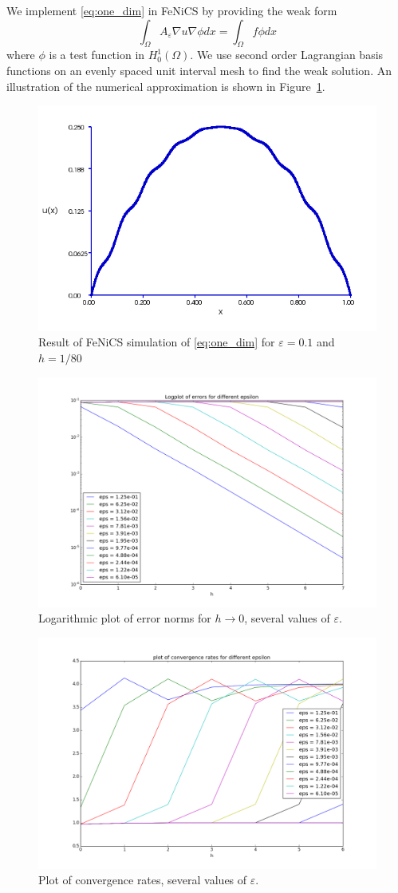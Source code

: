 \documentclass{article}
\renewcommand{\epsilon}{\varepsilon}
\begin{document}
We implement \eqref{eq:one_dim} in FeNiCS by providing the weak form
\begin{equation}
    \int_\Omega A_\epsilon\nabla u\nabla\phi dx= \int_\Omega f\phi dx
\end{equation}
where $\phi$ is a test function in $H^1_0(\Omega)$. We use second order Lagrangian basis functions on an evenly spaced unit interval mesh to find the weak solution.
An illustration of the numerical approximation is shown in Figure~\ref{fig:one_dim_approx}. 

\begin{figure}[ht]
    \centering
    \includegraphics[width=0.5\linewidth]{one_dim_approx.png}
    \caption{Result of FeNiCS simulation of \eqref{eq:one_dim} for $\epsilon=0.1$ and $h = 1/80$}
    \label{fig:one_dim_approx}
\end{figure}

\begin{figure}[ht]
    \centering
    \includegraphics[width=0.5\linewidth]{one_dim_h_eps1.png}
    \caption{Logarithmic plot of error norms for $h\to 0$, several values of $\epsilon$.}
    \label{fig:one_dim_h_eps1}
\end{figure}

\begin{figure}[ht]
    \centering
    \includegraphics[width=0.5\linewidth]{one_dim_h_eps2.png}
    \caption{Plot of convergence rates, several values of $\epsilon$.}
    \label{fig:one_dim_h_eps2}
\end{figure}
\end{document}
